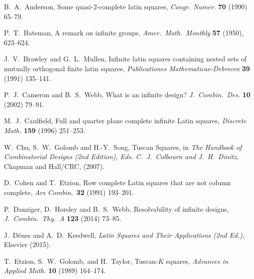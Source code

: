 \documentclass[12pt,a4paper]{article}
\begin{document}
\begin{thebibliography}{99}


B.~A.~Anderson, Some quasi-2-complete latin squares, {\em Congr. Numer.} {\bf 70} (1990) 65--79.







P.~T.~Bateman, A remark on infinite groups, {\em Amer.~Math.~Monthly} {\bf 57} (1950), 623--624.

J.~V.~Brawley and G.~L.~Mullen, Infinite latin squares containing nested sets of mutually orthogonal finite latin squares, {\em Publicationes Mathematicae-Debrecen} {\bf 39} (1991) 135--141.


P.~J.~Cameron and B.~S.~Webb, What is an infinite design? {\em J.~Combin.~Des.} {\bf 10} (2002) 79--91.

M.~J.~Caulfield, Full and quarter plane complete infinite Latin squares, {\em Discrete Math.} {\bf 159} (1996) 251--253.

W.~Chu, S.~W.~Golomb and H.-Y.~Song, Tuscan Squares, in {\em The Handbook of Combinatorial Designs (2nd Edition), Eds. C.~J.~Colbourn and J.~H.~Dinitz}, Chapman and Hall/CRC, (2007).

D.~Cohen and T.~Etzion, Row complete Latin squares that are not column complete, {\em Ars Combin.}~{\bf 32} (1991) 193--201.

P.~Danziger, D.~Horsley and B.~S.~Webb, Resolvability of infinite designs, {\em J.~Combin.~Thy.~A} {\bf 123} (2014) 73--85.

J.~D{\'e}nes and A.~D.~Keedwell, {\em Latin Squares and Their Applications (2nd Ed.)}, Elsevier (2015).

T.~Etzion, S.~W.~Golomb, and H.~Taylor, Tuscan-$K$ squares, {\em Advances in Applied Math.} {\bf 10} (1989) 164--174.



\end{thebibliography}
\end{document}
